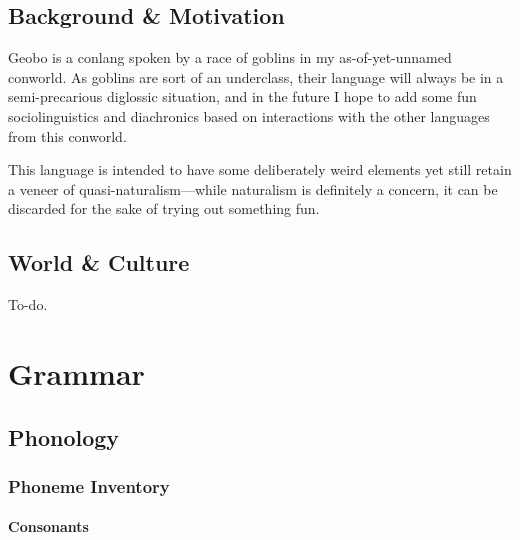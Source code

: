 \documentclass[a4paper,11pt,oneside,openany]{memoir}
\begin{document}
\begin{titlingpage}
\titleP
\end{titlingpage}
\frontmatter

\pagestyle{headings}

\chapter{Background \& Motivation}

Geobo{\engma} is a conlang spoken by a race of goblins in my as-of-yet-unnamed conworld. As goblins are sort of an underclass, their language will always be in a semi-precarious diglossic situation, and in the future I hope to add some fun sociolinguistics and diachronics based on interactions with the other languages from this conworld.

This language is intended to have some deliberately weird elements yet still retain a veneer of quasi-naturalism---while naturalism is definitely a concern, it can be discarded for the sake of trying out something fun.

\clearpage
\tableofcontents


\printnoidxglossary[type=\leipzigtype,title={Glossing Abbreviations}]

\chapter{World \& Culture}

To-do. \ToFirst \ToGob

\mainmatter

\part{Grammar}

\chapter{Phonology}

\section{Phoneme Inventory}\label{sec:phon_inv}

\subsection{Consonants}\label{ssec:consonant_inv}
\end{document}
